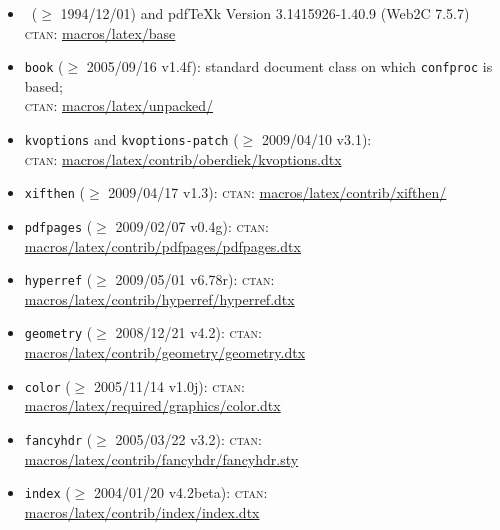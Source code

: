 \documentclass{article}
\newcommand{\ctan}{\textsc{ctan}}
\newcommand{\filename}{confproc}
\newcommand{\package}[1]{\texttt{#1}}
\begin{document}
\begin{itemize}
  \item \LaTeXe\ ($\ge$ 1994/12/01) and pdfTeXk Version 3.1415926-1.40.9 (Web2C 7.5.7)\\
    \ctan: \href{http://www.ctan.org/tex-archive/macros/latex/base}{macros/latex/base}
  \item \package{book}
             ($\ge$ 2005/09/16 v1.4f): standard document class on which \package{\filename} is based; \\
    \ctan:  \href{http://www.ctan.org/tex-archive/macros/latex/unpacked/}{macros/latex/unpacked/}
  \item \package{kvoptions} and \package{kvoptions-patch}
             ($\ge$ 2009/04/10 v3.1): \\
    \ctan:  \href{http://www.ctan.org/tex-archive/macros/latex/contrib/oberdiek/kvoptions.dtx}{macros/latex/contrib/oberdiek/kvoptions.dtx}
  \item \package{xifthen}
             ($\ge$ 2009/04/17 v1.3): 
    \ctan:  \href{http://www.ctan.org/tex-archive/macros/latex/contrib/xifthen/}{macros/latex/contrib/xifthen/}
  \item \package{pdfpages}
             ($\ge$ 2009/02/07 v0.4g): 
    \ctan:  \href{http://www.ctan.org/tex-archive/macros/latex/contrib/pdfpages/pdfpages.dtx}{macros/latex/contrib/pdfpages/pdfpages.dtx}
  \item \package{hyperref} 
             ($\ge$ 2009/05/01 v6.78r):
    \ctan:  \href{http://www.ctan.org/tex-archive/macros/latex/contrib/hyperref/hyperref.dtx}{macros/latex/contrib/hyperref/hyperref.dtx}
   \item \package{geometry}
             ($\ge$ 2008/12/21 v4.2): 
 	           \ctan:  \href{http://www.ctan.org/tex-archive/macros/latex/contrib/geometry/geometry.dtx}{macros/latex/contrib/geometry/geometry.dtx}
  \item \package{color}
             ($\ge$ 2005/11/14 v1.0j): 
    \ctan:  \href{http://www.ctan.org/tex-archive/macros/latex/required/graphics/color.dtx}{macros/latex/required/graphics/color.dtx}
  \item \package{fancyhdr}
             ($\ge$ 2005/03/22 v3.2): 
    \ctan:  \href{http://www.ctan.org/tex-archive/macros/latex/contrib/fancyhdr/fancyhdr.sty}{macros/latex/contrib/fancyhdr/fancyhdr.sty}
  \item \package{index}
             ($\ge$ 2004/01/20 v4.2beta): 
    \ctan:  \href{http://www.ctan.org/tex-archive/macros/latex/contrib/index/index.dtx}{macros/latex/contrib/index/index.dtx}

\end{itemize}
\end{document}
